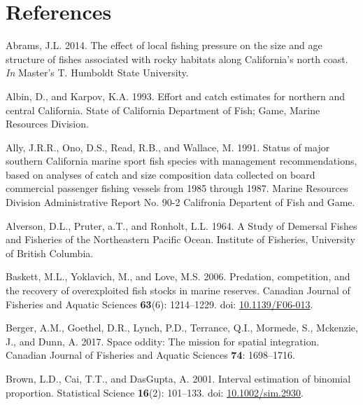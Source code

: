 \documentclass[
  english,
  a4paper,
]{article}
\newlength{\cslhangindent}
\newlength{\cslentryspacingunit} %
\newenvironment{CSLReferences}[2] %
 {%
  \setlength{\parindent}{0pt}
  \ifodd #1
  \let\oldpar\par
  \def\par{\hangindent=\cslhangindent\oldpar}
  \fi
  \setlength{\parskip}{#2\cslentryspacingunit}
 }%
 {}
\begin{document}
\clearpage

\hypertarget{references}{%
\section{References}\label{references}}

\hypertarget{refs}{}
\begin{CSLReferences}{1}{0}
\leavevmode{}%
Abrams, J.L. 2014. {The effect of local fishing pressure on the size and age structure of fishes associated with rocky habitats along California's north coast}. \emph{In} Master's T. Humboldt State University.

\leavevmode{}%
Albin, D., and Karpov, K.A. 1993. {Effort and catch estimates for northern and central California}. State of California Department of Fish; Game, Marine Resources Division.

\leavevmode{}%
Ally, J.R.R., Ono, D.S., Read, R.B., and Wallace, M. 1991. {Status of major southern California marine sport fish species with management recommendations, based on analyses of catch and size composition data collected on board commercial passenger fishing vessels from 1985 through 1987}. Marine Resources Division Administrative Report No. 90-2 Califronia Departent of Fish and Game.

\leavevmode{}%
Alverson, D.L., Pruter, a.T., and Ronholt, L.L. 1964. {A Study of Demersal Fishes and Fisheries of the Northeastern Pacific Ocean}. Institute of Fisheries, University of British Columbia.

\leavevmode{}%
Baskett, M.L., Yoklavich, M., and Love, M.S. 2006. {Predation, competition, and the recovery of overexploited fish stocks in marine reserves}. Canadian Journal of Fisheries and Aquatic Sciences \textbf{63}(6): 1214--1229. doi: \href{https://doi.org/10.1139/F06-013}{10.1139/F06-013}.

\leavevmode{}%
Berger, A.M., Goethel, D.R., Lynch, P.D., Terrance, Q.I., Mormede, S., Mckenzie, J., and Dunn, A. 2017. {Space oddity: The mission for spatial integration}. Canadian Journal of Fisheries and Aquatic Sciences \textbf{74}: 1698--1716.

\leavevmode{}%
Brown, L.D., Cai, T.T., and DasGupta, A. 2001. {Interval estimation of binomial proportion}. Statistical Science \textbf{16}(2): 101--133. doi: \href{https://doi.org/10.1002/sim.2930}{10.1002/sim.2930}.


\end{CSLReferences}
\end{document}
